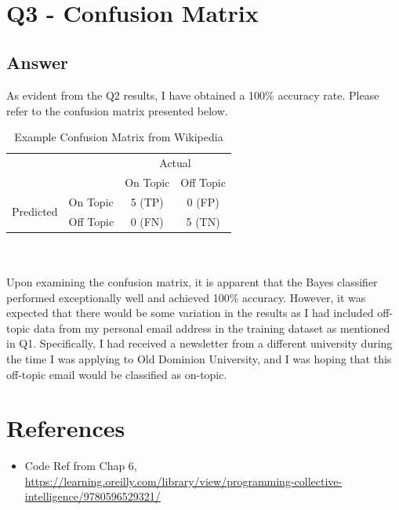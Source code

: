 \documentclass[12pt]{article}
\begin{document}
\\
\clearpage

\section*{Q3 - Confusion Matrix}

\subsection*{Answer}

As evident from the Q2 results, I have obtained a 100\% accuracy rate. Please refer to the confusion matrix presented below.

\begin{table}[h]
\centering
\caption{Example Confusion Matrix from Wikipedia}
\label{tbl:confusion}
\begin{tabular}{l|l|c|c|}
\multicolumn{2}{c}{}&\multicolumn{2}{c}{Actual}\\
\cline{3-4}
\multicolumn{2}{c|}{}&On Topic&Off Topic\\
\cline{2-4}
\multirow{2}{*}{Predicted}& On Topic & 5 (TP) & 0 (FP)\\
\cline{2-4}
& Off Topic & 0 (FN) & 5 (TN) \\
\cline{2-4}
\end{tabular}
\end{table}
\\
\\
Upon examining the confusion matrix, it is apparent that the Bayes classifier performed exceptionally well and achieved 100\% accuracy. However, it was expected that there would be some variation in the results as I had included off-topic data from my personal email address in the training dataset as mentioned in Q1. Specifically, I had received a newsletter from a different university during the time I was applying to Old Dominion University, and I was hoping that this off-topic email would be classified as on-topic.

 
\clearpage
\section*{References}



\begin{itemize}
    \item {Code Ref from Chap 6, \url{https://learning.oreilly.com/library/view/programming-collective-intelligence/9780596529321/}}
\end{itemize}
\end{document}
